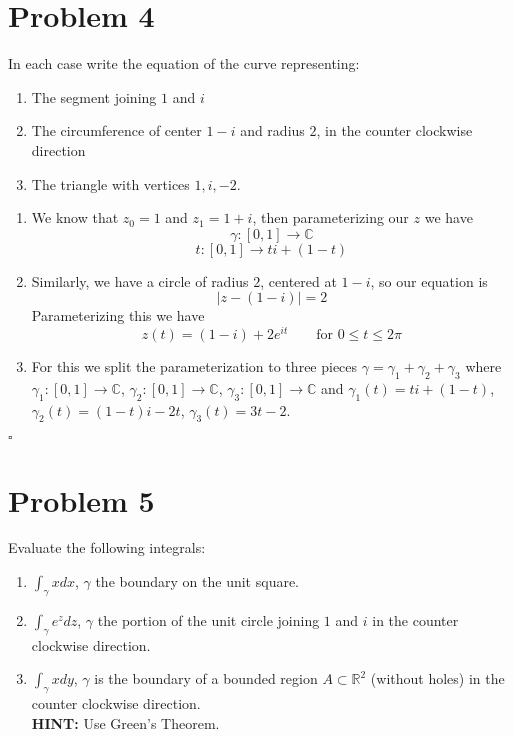 \documentclass[12pt]{article}
\newcommand{\C}{\mathbb{C}}
\newcommand{\R}{\mathbb{R}}
\newenvironment{proof}{\noindent{\bf Proof.}}{\hfill $\square$\medskip}
\begin{document}
\section{Problem 4}
In each case write the equation of the curve representing:
\begin{enumerate}[label=\textbf{(\alph*)}]
    \item The segment joining $1$ and $i$
    \item The circumference of center $1-i$ and radius $2$, in the counter clockwise direction
    \item The triangle with vertices $1, i, -2$.
\end{enumerate}

\begin{proof}
\begin{enumerate}[label=\textbf{(\alph*)}]
    \item We know that $z_{0}=1$ and $z_{1}=1+i$, then parameterizing our $z$ we have
    $$\gamma:[0,1]\to\C$$
    $$t:[0,1]\to ti+(1-t)$$
    \item Similarly, we have a circle of radius $2$, centered at $1-i$, so our equation is
    $$\left|z-(1-i)\right|=2$$
    Parameterizing this we have
    $$z(t)=(1-i)+2e^{it}\qquad \text{for }0\leq t\leq 2\pi$$
    \item For this we split the parameterization to three pieces $\gamma=\gamma_{1}+\gamma_{2}+\gamma_{3}$ where $\gamma_{1}:[0,1]\to\C$, $\gamma_{2}:[0,1]\to\C$, $\gamma_{3}:[0,1]\to\C$ and $\gamma_{1}(t)=ti+(1-t)$, $\gamma_{2}(t)=(1-t)i-2t$, $\gamma_{3}(t)=3t-2$.
\end{enumerate}
\end{proof}


\newpage
\section{Problem 5}
Evaluate the following integrals:
\begin{enumerate}[label=\textbf{(\alph*)}]
    \item $\int_{\gamma}xdx$, $\gamma$ the boundary on the unit square.
    \item $\int_{\gamma}e^{z}dz$, $\gamma$ the portion of the unit circle joining $1$ and $i$ in the counter clockwise direction.
    \item $\int_{\gamma}xdy$, $\gamma$ is the boundary of a bounded region $A\subset\R^{2}$ (without holes) in the counter clockwise direction.\\\textbf{HINT:} Use Green's Theorem.
\end{enumerate}
\end{document}
